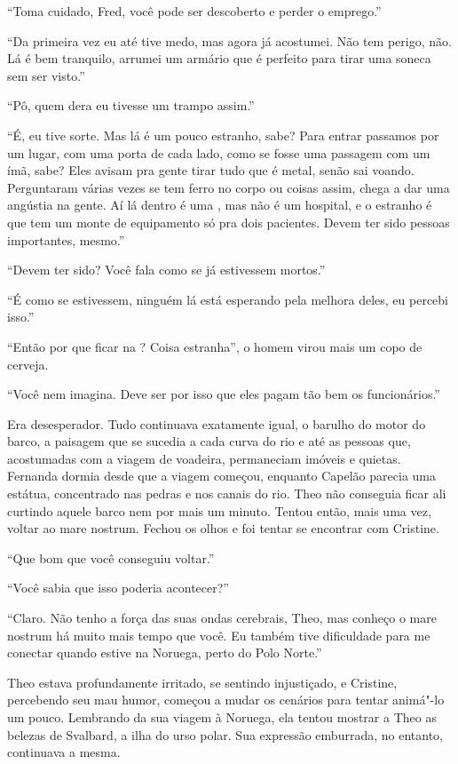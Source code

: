 ``Toma cuidado, Fred, você pode ser descoberto e perder o emprego.''

``Da primeira vez eu até tive medo, mas agora já acostumei. Não tem
perigo, não. Lá é bem tranquilo, arrumei um armário que é perfeito para
tirar uma soneca sem ser visto.''

``Pô, quem dera eu tivesse um trampo assim.''

``É, eu tive sorte. Mas lá é um pouco estranho, sabe? Para entrar
passamos por um lugar, com uma porta de cada lado, como se fosse uma
passagem com um ímã, sabe? Eles avisam pra gente tirar tudo que é metal,
senão sai voando. Perguntaram várias vezes se tem ferro no corpo ou
coisas assim, chega a dar uma angústia na gente. Aí lá dentro é uma ,
mas não é um hospital, e o estranho é que tem um monte de equipamento só
pra dois pacientes. Devem ter sido pessoas importantes, mesmo.''

``Devem ter sido? Você fala como se já estivessem mortos.''

``É como se estivessem, ninguém lá está esperando pela melhora deles, eu
percebi isso.''

``Então por que ficar na ? Coisa estranha'', o homem virou mais um
copo de cerveja.

``Você nem imagina. Deve ser por isso que eles pagam tão bem os
funcionários.''

\asterisc

Era desesperador. Tudo continuava exatamente igual, o barulho do motor
do barco, a paisagem que se sucedia a cada curva do rio e até as pessoas
que, acostumadas com a viagem de voadeira, permaneciam imóveis e
quietas. Fernanda dormia desde que a viagem começou, enquanto Capelão
parecia uma estátua, concentrado nas pedras e nos canais do rio. Theo
não conseguia ficar ali curtindo aquele barco nem por mais um minuto.
Tentou então, mais uma vez, voltar ao mare nostrum. Fechou os olhos e foi
tentar se encontrar com Cristine.

``Que bom que você conseguiu voltar.''

``Você sabia que isso poderia acontecer?''

``Claro. Não tenho a força das suas ondas cerebrais, Theo, mas conheço o
mare nostrum há muito mais tempo que você. Eu também tive dificuldade
para me conectar quando estive na Noruega, perto do Polo Norte.''

Theo estava profundamente irritado, se sentindo injustiçado, e Cristine,
percebendo seu mau humor, começou a mudar os cenários para tentar
animá"-lo um pouco. Lembrando da sua viagem à Noruega, ela tentou mostrar
a Theo as belezas de Svalbard, a ilha do urso polar. Sua expressão
emburrada, no entanto, continuava a mesma.

